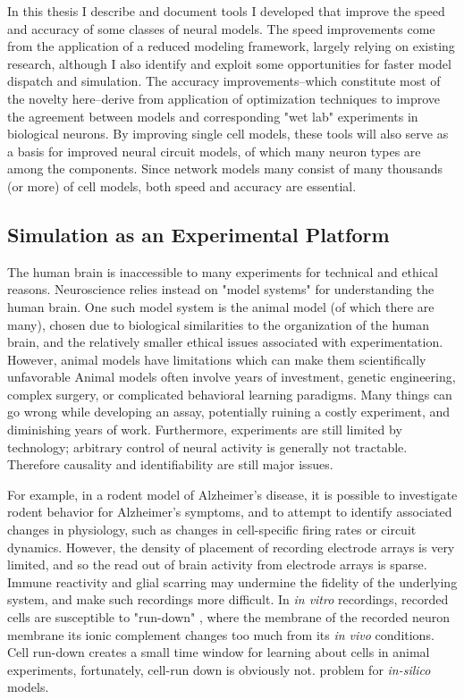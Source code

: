 In this thesis I describe and document tools I developed that improve the speed and accuracy of some classes of neural models.
The speed improvements come from the application of a reduced modeling framework, largely relying on existing research, although I also identify and exploit some opportunities for faster model dispatch and simulation.
The accuracy improvements--which constitute most of the novelty here--derive from application of optimization techniques to improve the agreement between models and corresponding "wet lab" experiments in biological neurons.
By improving single cell models, these tools will also serve as a basis for improved neural circuit models, of which many neuron types are among the components.
Since network models many consist of many thousands (or more) of cell models, both speed and accuracy are essential.
\\

\subsection{Simulation as an Experimental Platform}
The human brain is inaccessible to many experiments for technical and ethical reasons.
Neuroscience relies instead on "model systems" for understanding the human brain.
One such model system is the animal model (of which there are many), chosen due to biological similarities to the organization of the human brain, and the relatively smaller ethical issues associated with experimentation.
However, animal models have limitations which can make them scientifically unfavorable
Animal models often involve years of investment, genetic engineering, complex surgery, or complicated behavioral learning paradigms.
Many things can go wrong while developing an assay, potentially ruining a costly experiment, and diminishing years of work.
Furthermore, experiments are still limited by technology; arbitrary control of neural activity is generally not tractable.
Therefore causality and identifiability are still major issues.

For example, in a rodent model of Alzheimer's disease, it is possible to investigate rodent behavior for Alzheimer's symptoms, and to attempt to identify associated changes in physiology, such as changes in cell-specific firing rates or circuit dynamics.
However, the density of placement of recording electrode arrays is very limited, and so the read out of brain activity from electrode arrays is sparse.
Immune reactivity and glial scarring may undermine the fidelity of the underlying system, and make such recordings more difficult.
In \emph{in vitro} recordings, recorded cells are susceptible to "run-down" \citep{colquhoun1994ion}, where the membrane of the recorded neuron membrane its ionic complement changes too much from its \emph{in vivo} conditions. 
Cell run-down creates a small time window for learning about cells in animal experiments, fortunately, cell-run down is obviously not. problem for \emph{in-silico} models.


